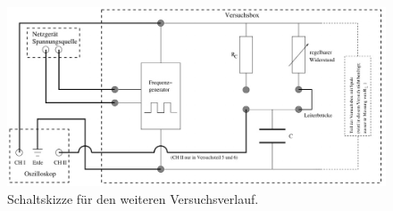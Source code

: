 \begin{enumerate}
	\begin{figure}[t]
		\centering
			\includegraphics[width=\textwidth]{Abbildungen/Schaltung.jpg}
		\caption{Schaltskizze für den weiteren Versuchsverlauf.}
		\label{fig:Schaltung}
	\end{figure}
	

\end{enumerate}
